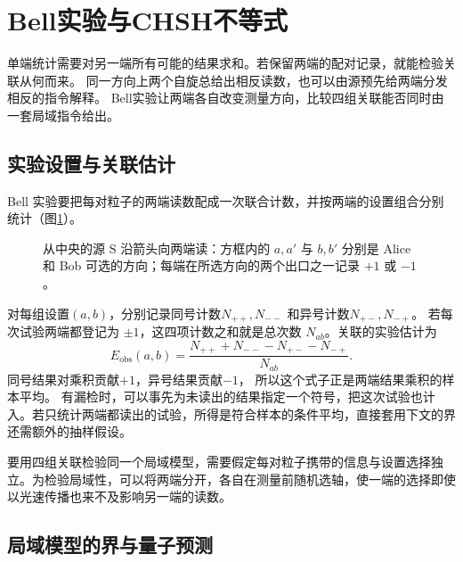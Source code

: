 \section{Bell实验与CHSH不等式}
单端统计需要对另一端所有可能的结果求和。若保留两端的配对记录，就能检验关联从何而来。
同一方向上两个自旋总给出相反读数，也可以由源预先给两端分发相反的指令解释。
Bell实验让两端各自改变测量方向，比较四组关联能否同时由一套局域指令给出。

\subsection{实验设置与关联估计}
\label{ss:bell-counting}

Bell 实验要把每对粒子的两端读数配成一次联合计数，并按两端的设置组合分别统计（图\ref{fig:bell-pair}）。

\begin{figure}[htbp]
    \centering
    \caption{从中央的源 $\mathrm{S}$ 沿箭头向两端读：方框内的 $a,a'$ 与 $b,b'$ 分别是 Alice 和 Bob 可选的方向；每端在所选方向的两个出口之一记录 $+1$ 或 $-1$。}
    \label{fig:bell-pair}
\end{figure}

对每组设置$(a,b)$，分别记录同号计数$N_{++},N_{--}$
和异号计数$N_{+-},N_{-+}$。
若每次试验两端都登记为 $\pm1$，这四项计数之和就是总次数 $N_{ab}$。关联的实验估计为
\begin{equation}
    E_{\mathrm{obs}}(a,b) =
    \frac{N_{++} + N_{--} - N_{+-} - N_{-+}}{N_{ab}}.
\end{equation}
同号结果对乘积贡献$+1$，异号结果贡献$-1$，
所以这个式子正是两端结果乘积的样本平均。
有漏检时，可以事先为未读出的结果指定一个符号，把这次试验也计入。若只统计两端都读出的试验，所得是符合样本的条件平均，直接套用下文的界还需额外的抽样假设。

要用四组关联检验同一个局域模型，需要假定每对粒子携带的信息与设置选择独立。为检验局域性，可以将两端分开，各自在测量前随机选轴，使一端的选择即使以光速传播也来不及影响另一端的读数\cite{belltests}。

\subsection{局域模型的界与量子预测}
\label{ss:chsh-derivation}

